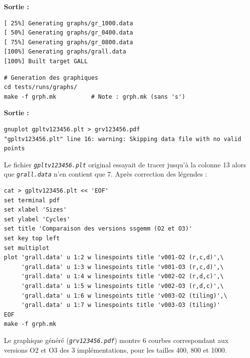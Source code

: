 \documentclass[a4paper,11pt]{article}
\newcommand{\file}[1]{\texttt{\textit{#1}}}
\begin{document}
\textbf{Sortie :}
\begin{lstlisting}[style=output]
[ 25%] Generating graphs/gr_1000.data
[ 50%] Generating graphs/gr_0400.data
[ 75%] Generating graphs/gr_0800.data
[100%] Generating graphs/grall.data
[100%] Built target GALL
\end{lstlisting}

\begin{lstlisting}[style=bash]
# Generation des graphiques
cd tests/runs/graphs/
make -f grph.mk          # Note : grph.mk (sans 's')
\end{lstlisting}

\textbf{Sortie :}
\begin{lstlisting}[style=output]
gnuplot gpltv123456.plt > grv123456.pdf
"gpltv123456.plt" line 16: warning: Skipping data file with no valid points
\end{lstlisting}

Le fichier \file{gpltv123456.plt} original essayait de tracer jusqu'\`a la colonne 13
alors que \file{grall.data} n'en contient que 7. Apr\`es correction des l\'egendes :

\begin{lstlisting}[style=bash]
cat > gpltv123456.plt << 'EOF'
set terminal pdf
set xlabel 'Sizes'
set ylabel 'Cycles'
set title 'Comparaison des versions ssgemm (O2 et O3)'
set key top left
set multiplot
plot 'grall.data' u 1:2 w linespoints title 'v001-O2 (r,c,d)',\
     'grall.data' u 1:3 w linespoints title 'v001-O3 (r,c,d)',\
     'grall.data' u 1:4 w linespoints title 'v002-O2 (r,d,c)',\
     'grall.data' u 1:5 w linespoints title 'v002-O3 (r,d,c)',\
     'grall.data' u 1:6 w linespoints title 'v003-O2 (tiling)',\
     'grall.data' u 1:7 w linespoints title 'v003-O3 (tiling)'
EOF
make -f grph.mk
\end{lstlisting}

Le graphique g\'en\'er\'e (\file{grv123456.pdf}) montre 6 courbes correspondant aux
versions O2 et O3 des 3 impl\'ementations, pour les tailles 400, 800 et 1000.
\end{document}
